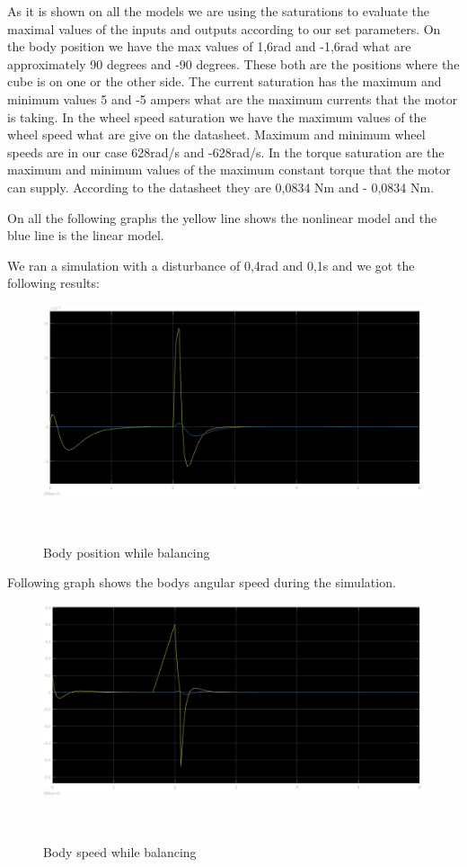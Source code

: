 As it is shown on all the models we are using the saturations to evaluate the maximal values of the inputs and outputs according to our set parameters.
On the body position we have the max values of 1,6rad and -1,6rad what are approximately 90 degrees and -90 degrees.
These both are the positions where the cube is on one or the other side.
The current saturation has the maximum and minimum values 5 and -5 ampers what are the maximum currents that the motor is taking.
In the wheel speed saturation we have the maximum values of the wheel speed what are give on the datasheet.
Maximum and minimum wheel speeds are in our case 628rad/s and -628rad/s.
In the torque saturation are the maximum and minimum values of the maximum constant torque that the motor can supply.
According to the datasheet they are 0,0834 Nm and - 0,0834 Nm.

On all the following graphs the yellow line shows the nonlinear model and the blue line is the linear model.

We ran a simulation with a disturbance of 0,4rad and 0,1s and we got the following results:
\begin{figure}[H]

	
	\centering
 	\includegraphics[width=1\textwidth]{images/pos0401.jpg}
	
	~
	\caption{Body position while balancing} 
 	\label{fig:mech} 
\end{figure}

Following graph shows the bodys angular speed during the simulation.
\begin{figure}[H]

	
	\centering
 	\includegraphics[width=1\textwidth]{images/acc0401.jpg}
	
	~
	\caption{Body speed while balancing} 
 	\label{fig:mech} 
\end{figure}

